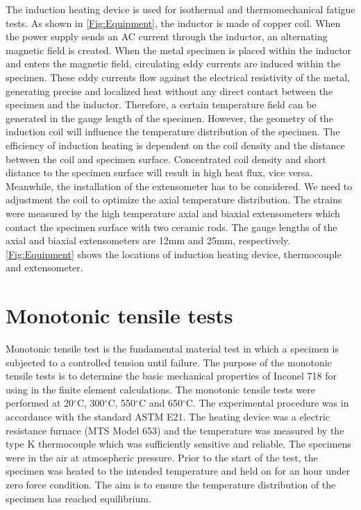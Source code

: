 The induction heating device is used for isothermal and thermomechanical fatigue tests.
As shown in \ref{Fig:Equipment}, the inductor is made of copper coil.
When the power supply sends an AC current through the inductor, an alternating magnetic field is created.
When the metal specimen is placed within the inductor and enters the magnetic field, circulating eddy currents are induced within the specimen.
These eddy currents flow against the electrical resistivity of the metal, generating precise and localized heat without any direct contact between the specimen and the inductor.
Therefore, a certain temperature field can be generated in the gauge length of the specimen.
However, the geometry of the induction coil will influence the temperature distribution of the specimen.
The efficiency of induction heating is dependent on the coil density and the distance between the coil and specimen surface.
Concentrated coil density and short distance to the specimen surface will result in high heat flux, vice versa.
Meanwhile, the installation of the extensometer has to be considered.
We need to adjustment the coil to optimize the axial temperature distribution.
The strains were measured by the high temperature axial and biaxial extensometers which contact the specimen surface with two ceramic rods.
The gauge lengths of the axial and biaxial extensometers are 12mm and 25mm, respectively.
\ref{Fig:Equipment} shows the locations of induction heating device, thermocouple and extensometer.


\section{Monotonic tensile tests}
\noindent Monotonic tensile test is the fundamental material test in which a specimen is subjected to a controlled tension until failure.
The purpose of the monotonic tensile tests is to determine the basic mechanical properties of Inconel 718 for using in the finite element calculations.
The monotonic tensile tests were performed at 20$^{\circ}$C, 300$^{\circ}$C, 550$^{\circ}$C and 650$^{\circ}$C.
The experimental procedure was in accordance with the standard ASTM E21.
The heating device was a electric resistance furnace (MTS Model 653) and the temperature was measured by the type K thermocouple which was sufficiently sensitive and reliable.
The specimens were in the air at atmospheric pressure.
Prior to the start of the test, the specimen was heated to the intended temperature and held on for an hour under zero force condition.
The aim is to ensure the temperature distribution of the specimen has reached equilibrium.

